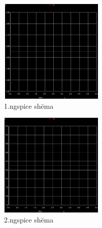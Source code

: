 \documentclass{report}
\begin{document}
\begin{figure}[!h]
\centering
\includegraphics[width=5cm, height=5cm]{011.ps}
\caption{1.ngspice shēma}
\label{2}
\end{figure}
\begin{figure}
    \centering
\includegraphics[width=5cm, height=5cm]{012.ps}
    \caption{2.ngspice shēma}
    \label{3}
\end{figure}




\vspace{6cm}
\end{document}
